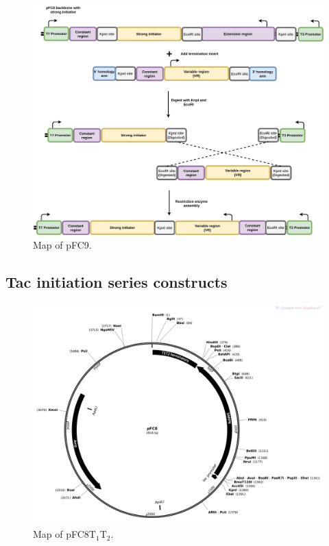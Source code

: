 \documentclass[11pt]{article}
\begin{document}
\begin{figure}[H]
	\includegraphics[width=15cm]{images/termination_assembly_pFC8.png}
	\centering
	\caption{Map of pFC9.}
	\label{fig:pFC8_cloning}
\end{figure}


\subsection{Tac initiation series constructs}

\begin{figure}[H]
	\includegraphics[width=15cm]{images/pFC8tacT1T2_Map.png}
	\centering
	\caption{Map of pFC8T$_1$T$_2$.}
	\label{fig:pFC8T1T2}
\end{figure}
\end{document}
